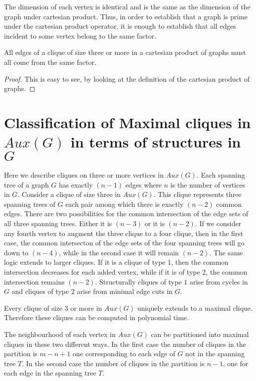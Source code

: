 \documentclass{llncs}
\begin{document}
The dimension of each vertex is identical and is the same as the dimension of the graph under cartesian product. Thus, in order to establish that a graph is prime under the cartesian product operator, it is enough to establish that all edges incident to some vertex belong to the same factor. 

\begin{lemma}
	All edges of a clique of size three or more in a cartesian product of graphs must all come from the same factor.
\end{lemma}
\begin{proof}
	This is easy to see, by looking at the definition of the cartesian product of graphs.
\end{proof}

\section{Classification of Maximal cliques in $Aux(G)$ in terms of structures in $G$}\label{seccliq}
Here we describe cliques on three or more vertices in $Aux(G)$. Each spanning tree of a graph $G$ has exactly $(n-1)$ edges where $n$ is the number of vertices in $G$. Consider a clique of size three in $Aux(G)$. This clique represents three spanning trees of $G$ each pair among which there is exactly $(n-2)$ common edges. There are two possibilities for the common intersection of the edge sets of all three spanning trees. Either it is $(n-3)$ or it is $(n-2)$. If we consider any fourth vertex to augment the three clique to a four clique, then in the first case, the common intersecton of the edge sets of the four spanning trees will go down to $(n-4)$, while in the second case it will remain $(n-2)$. The same logic extends to larger cliques. If it is a clique of type 1, then the common intersection decreases for each added vertex, while if it is of type 2, the common intersection remains $(n-2)$. Structurally cliques of type $1$ arise from cycles in $G$ and cliques of type $2$ arise from minimal edge cuts in $G$. 

\begin{lemma} \label{maxclique}
	Every clique of size $3$ or more in $Aux(G)$  uniquely extends to a maximal clique. Therefore these cliques can be computed in polynomial time.
\end{lemma}

The neighbourhood of each vertex in $Aux(G)$ can be partitioned into maximal cliques in these two different ways. In the first case the number of cliques in the partition is $m-n+1$ one corresponding to each edge of $G$ not in the spanning tree $T$. In the second case the number of cliques in the partition is $n-1$, one for each edge in the spanning tree $T$.
\end{document}
